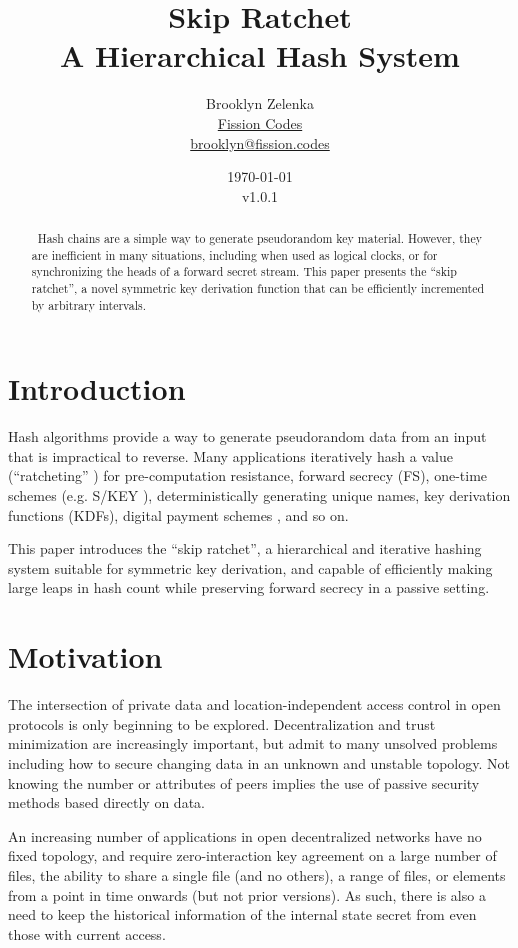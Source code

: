 \documentclass[twocolumn]{article}
\title{Skip Ratchet \\[1ex] \large A Hierarchical Hash System}
\author{Brooklyn Zelenka \\ \href{https://fission.codes}{Fission Codes} \\ \href{mailto:brooklyn@fission.codes}{brooklyn@fission.codes} }
\date{\today\\v1.0.1}
\begin{document}
    \maketitle
    
    
   	\begin{abstract}\
   		Hash chains are a simple way to generate pseudorandom key material. However, they are inefficient in many situations, including when used as logical clocks, or for synchronizing the heads of a forward secret stream. This paper presents the ``skip ratchet'', a novel symmetric key derivation function that can be efficiently incremented by arbitrary intervals.
   	\end{abstract}

   	\section{Introduction}
   	
	Hash algorithms provide a way to generate pseudorandom data from an input that is impractical to reverse. Many applications iteratively hash a value (``ratcheting'' \cite{pond}) for pre-computation resistance, forward secrecy (FS), one-time schemes (e.g. S/KEY \cite{rfc1760}), deterministically generating unique names, key derivation functions (KDFs), digital payment schemes \cite{multidimensional}, and so on.
	
	This paper introduces the ``skip ratchet'', a hierarchical and iterative hashing system suitable for symmetric key derivation, and capable of efficiently making large leaps in hash count while preserving forward secrecy in a passive setting.

    \section{Motivation}
    
    The intersection of private data and location-independent access control in open protocols is only beginning to be explored. Decentralization and trust minimization are increasingly important, but admit to many unsolved problems including how to secure changing data in an unknown and unstable topology. Not knowing the number or attributes of peers implies the use of passive security methods based directly on data.
    
    An increasing number of applications in open decentralized networks have no fixed topology, and require zero-interaction key agreement on a large number of files, the ability to share a single file (and no others), a range of files, or elements from a point in time onwards (but not prior versions). As such, there is also a need to keep the historical information of the internal state secret from even those with current access.
    
\end{document}
